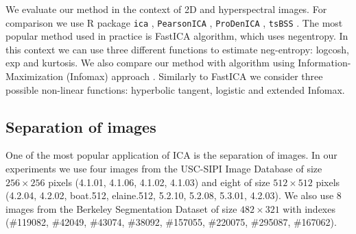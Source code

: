 We evaluate our method in the context of 2D and hyperspectral images. 
For comparison we use R package {\tt ica} \cite{ica}, {\tt PearsonICA} \cite{pearsonica}, {\tt ProDenICA} \cite{prodenica}, {\tt tsBSS} \cite{tsBSS}.
The most popular method used in practice is FastICA \cite{hyvarinen1999fast,helwig2013critique} algorithm, which uses negentropy. In this context we can use three different functions to estimate neg-entropy:
logcosh, exp and kurtosis.
We also compare our method with algorithm using Information-Maximization (Infomax) approach \cite{bell1995information}. Similarly to FastICA we consider three possible non-linear functions: hyperbolic tangent, logistic and extended Infomax.
%
%




\subsection{Separation of images}

One of the most popular application of ICA is the separation of images. In our experiments we use four images from the USC-SIPI Image Database of size $256 \times 256$ pixels (4.1.01, 4.1.06, 4.1.02, 4.1.03) and eight of size $512 \times 512$ pixels (4.2.04, 4.2.02, boat.512, elaine.512, 5.2.10, 5.2.08, 5.3.01, 4.2.03). We also use 8 images from the Berkeley Segmentation Dataset of size $482 \times 321$ with indexes (\#119082, \#42049, \#43074, \#38092, \#157055, \#220075, \#295087, \#167062). 

